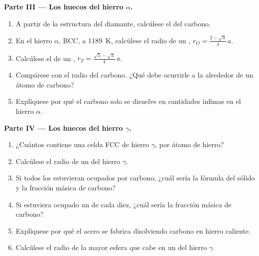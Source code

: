 \begin{problem}
\medskip
\noindent\textbf{Parte III --- Los huecos del hierro $\alpha$.}
\begin{enumerate}[resume]
  \item A partir de la estructura del diamante, calcúlese el  del carbono.
  \item En el hierro $\alpha$, BCC, a \qty{1189}{K}, calcúlese el radio de
        un , $r_O = \frac{2 - \sqrt3}{4}\,a$.
  \item Calcúlese el de un , $r_T = \frac{\sqrt5 -
        \sqrt3}{4}\,a$.
  \item Compárese con el radio del carbono. ¿Qué debe ocurrirle a la 
        alrededor de un átomo de carbono?
  \item Explíquese por qué el carbono solo se disuelve en cantidades
        ínfimas en el hierro $\alpha$.
\end{enumerate}

\medskip
\noindent\textbf{Parte IV --- Los huecos del hierro $\gamma$.}
\begin{enumerate}[resume]
  \item ¿Cuántos  contiene una celda FCC de hierro
        $\gamma$, por átomo de hierro?
  \item Calcúlese el radio de un  del hierro $\gamma$.
  \item Si todos los  estuvieran ocupados por carbono,
        ¿cuál sería la fórmula del sólido y la fracción másica de carbono?
  \item Si estuviera ocupado un  de cada diez, ¿cuál
        sería la fracción másica de carbono?
  \item Explíquese por qué el acero se fabrica disolviendo carbono en
        hierro caliente.
  \item Calcúlese el radio de la mayor esfera que cabe en un  del hierro $\gamma$.
\end{enumerate}
\end{problem}
